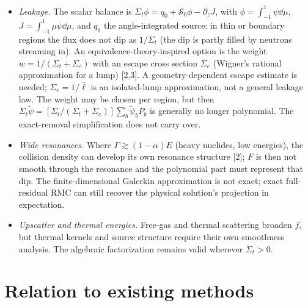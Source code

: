 \documentclass[11pt]{article}
\newcommand{\tpsi}{\tilde\psi}
\newcommand{\Sigt}{\Sigma_t}
\begin{document}
\begin{itemize}
  \item \emph{Leakage.} The scalar balance is
  $\Sigt\phi=q_0+\mathcal S_0\phi-\partial_zJ$, with
  $\phi=\int_{-1}^1\psi\dd\mu$, $J=\int_{-1}^1\mu\psi\dd\mu$, and $q_0$
  the angle-integrated source:
  in thin or boundary regions the flux does not dip as $1/\Sigt$ (the dip is partly
  filled by neutrons streaming in). An equivalence-theory-inspired option is the
  weight $w = 1/(\Sigt + \Sigma_e)$ with an escape cross section $\Sigma_e$ (Wigner's
  rational approximation for a lump) [2,3]. A geometry-dependent escape estimate
  is needed; $\Sigma_e=1/\bar\ell$ is an isolated-lump approximation, not a general
  leakage law. The weight may be chosen per region, but then
  $\Sigt\tpsi=[\Sigt/(\Sigt+\Sigma_e)]\sum_b\tpsi_bP_b$ is generally no longer
  polynomial. The exact-removal simplification does not carry over.
  \item \emph{Wide resonances.} Where $\Gamma \gtrsim (1-\alpha)E$ (heavy nuclides, low
  energies), the collision density can develop its own resonance structure [2];
  $F$ is then not smooth through the resonance and the polynomial part must represent
  that dip. The finite-dimensional Galerkin approximation is not exact; exact
  full-residual RMC can still recover the physical solution's projection in expectation.
  \item \emph{Upscatter and thermal energies.} Free-gas and thermal scattering broaden
  $f$, but thermal kernels and source structure require their own smoothness analysis.
  The algebraic factorization remains valid wherever $\Sigt>0$.
\end{itemize}

\section{Relation to existing methods}
\end{document}
